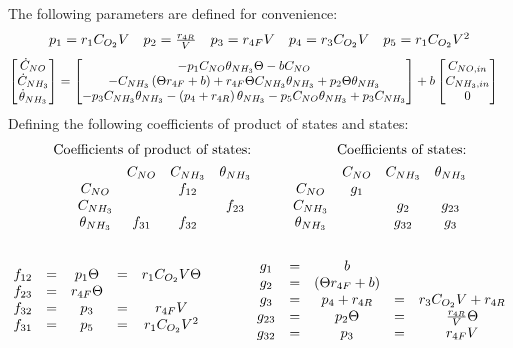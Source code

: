 The following parameters are defined for convenience:
\begin{align*}
    \begin{matrix} 
    p_1 = r_1 C_{O_2} V
    &p_2 =  \frac{r_{4R}}{V}
    &p_3 = r_{4F} V
    &p_4 = r_3 C_{O_2} V
    &p_5 = r_1 C_{O_2} V^2
     \end{matrix}
\end{align*}
\begin{align*}
     \begin{bmatrix} \dot C_{NO} \\
        \dot C_{NH_3}\\
        \dot \theta_{NH_3}\\
         \end{bmatrix} &=
    \begin{bmatrix} 
        -p_1 C_{NO} \theta_{NH_3} \Theta
        -b C_{NO}
        \\
        -C_{NH_3} \left( \Theta r_{4F} + b \right)
        + r_{4F} \Theta C_{NH_3} \theta_{NH_3}
        + p_2 \Theta \theta_{NH_3}
        \\
        -p_3C_{NH_3} \theta_{NH_3}
        -\left( p_4 + r_{4R} \right) \theta_{NH_3}
        -p_5 C_{NO} \theta_{NH_3}
        + p_3 C_{NH_3}
     \end{bmatrix}
    + b \begin{bmatrix} C_{NO, in} \\ C_{NH_3, in} \\ 0 \end{bmatrix}
\end{align*}
Defining the following coefficients of product of states and states:
\begin{align*}
    \text{Coefficients of product of states:} &\qquad& \text{Coefficients of states:}\\
    \begin{matrix}              & C_{NO} & C_{NH_3} & \theta_{NH_3} \\
        C_{NO}        &        & f_{12}   &        \\
        C_{NH_3}      &        &          & f_{23} \\
        \theta_{NH_3} & f_{31} & f_{32}   & \end{matrix}
    &\qquad &
    \begin{matrix}              & C_{NO} & C_{NH_3} & \theta_{NH_3} \\
        C_{NO}        & g_1    &          &        \\
        C_{NH_3}      &        & g_{2}    & g_{23}        \\
        \theta_{NH_3} &        & g_{32}   & g_{3} \end{matrix}
\end{align*}
\begin{align*}
    \begin{matrix} 
    \\f_{12} &=& p_1 \Theta    &=& r_1 C_{O_2} V \Theta
    \\f_{23} &=& r_{4F} \Theta & &
    \\f_{32} &=& p_3           &=& r_{4F} V
    \\f_{31} &=& p_5           &=& r_1 C_{O_2} V^2 \end{matrix}
    \qquad \qquad
    \begin{matrix} 
    \\ g_1    &=& b                      & &
    \\ g_2    &=& \left( \Theta r_{4F} + b \right) & &
    \\ g_{3}  &=& p_4 + r_{4R}           &=& r_3 C_{O_2} V + r_{4R}
    \\ g_{23} &=& p_2 \Theta             &=&  \frac{r_{4R}}{V} \Theta
    \\ g_{32} &=& p_3                    &=& r_{4F} V
     \end{matrix}
\end{align*}

